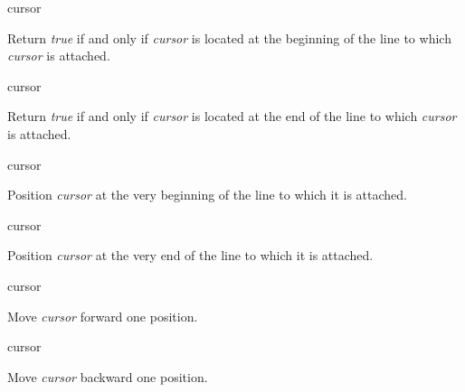  {cursor}

Return \textit{true} if and only if \textit{cursor} is located at the
beginning of the line to which \textit{cursor} is attached.

 {cursor}

Return \textit{true} if and only if \textit{cursor} is located at the
end of the line to which \textit{cursor} is attached.

 {cursor}

Position \textit{cursor} at the very beginning of the line to which it
is attached.

 {cursor}

Position \textit{cursor} at the very end of the line to which it
is attached.

 {cursor}

Move \textit{cursor} forward one position.

 {cursor}

Move \textit{cursor} backward one position.
